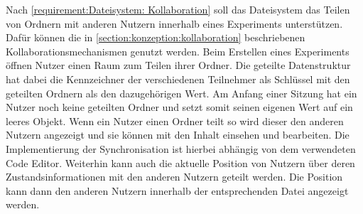 Nach \autoref{requirement:Dateisystem: Kollaboration} soll das Dateisystem das Teilen von Ordnern mit anderen Nutzern innerhalb eines Experiments unterstützen. Dafür können die in \autoref{section:konzeption:kollaboration} beschriebenen Kollaborationsmechanismen genutzt werden. Beim Erstellen eines Experiments öffnen Nutzer einen Raum zum Teilen ihrer Ordner. Die geteilte Datenstruktur hat dabei die Kennzeichner der verschiedenen Teilnehmer als Schlüssel mit den geteilten Ordnern als den dazugehörigen Wert. Am Anfang einer Sitzung hat ein Nutzer noch keine geteilten Ordner und setzt somit seinen eigenen Wert auf ein leeres Objekt. Wenn ein Nutzer einen Ordner teilt so wird dieser den anderen Nutzern angezeigt und sie können mit den Inhalt einsehen und bearbeiten. Die Implementierung der Synchronisation ist hierbei abhängig von dem verwendeten Code Editor. Weiterhin kann auch die aktuelle Position von Nutzern über deren Zustandsinformationen mit den anderen Nutzern geteilt werden. Die Position kann dann den anderen Nutzern innerhalb der entsprechenden Datei angezeigt werden.

